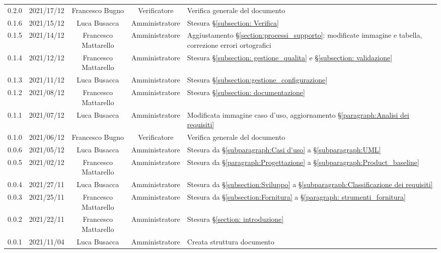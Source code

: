 \begin{center}
\begin{longtable}[c]{c | c | c | c | p{5cm}}
0.2.0 & 2021/17/12 & Francesco Bugno & Verificatore & Verifica generale del documento\\
0.1.6 & 2021/15/12 & Luca Busacca & Amministratore & Stesura §\ref{subsection: Verifica}\\
0.1.5 & 2021/14/12 & Francesco Mattarello & Amministratore & Aggiustamento §\ref{section:processi_supporto}: modificate immagine e tabella, correzione errori ortografici\\
0.1.4 & 2021/12/12 & Francesco Mattarello & Amministratore & Stesura §\ref{subsection: gestione_qualita} e §\ref{subsection: validazione}\\
0.1.3 & 2021/11/12 & Luca Busacca & Amministratore & Stesura  §\ref{subsection:gestione_configurazione} \\
0.1.2 & 2021/08/12 & Francesco Mattarello & Amministratore & Stesura §\ref{subsection: documentazione}\\
0.1.1 & 2021/07/12 & Luca Busacca & Amministratore & Modificata immagine caso d'uso, aggiornamento §\ref{paragraph:Analisi dei requisiti}\\ 
0.1.0 & 2021/06/12 & Francesco Bugno & Verificatore & Verifica generale del documento\\
0.0.6 & 2021/05/12 & Luca Busacca & Amministratore & Stesura da  §\ref{subparagraph:Casi d'uso} a §\ref{subparagraph:UML} \\
0.0.5 & 2021/02/12 & Francesco Mattarello & Amministratore & Stesura da  §\ref{paragraph:Progettazione} a §\ref{subparagraph:Product_baseline} \\
0.0.4 & 2021/27/11 & Luca Busacca & Amministratore & Stesura da §\ref{subsection:Sviluppo} a  §\ref{subparagraph:Classificazione dei requisiti} \\
0.0.3 & 2021/25/11 & Francesco Mattarello & Amministratore & Stesura da §\ref{subsection:Fornitura} a §\ref{paragraph: strumenti_fornitura} \\
0.0.2 & 2021/22/11 & Francesco Mattarello & Amministratore & Stesura §\ref{section: introduzione}\\
0.0.1 & 2021/11/04 & Luca Busacca & Amministratore &Creata struttura documento\\
		
	\end{longtable}
\end{center}
